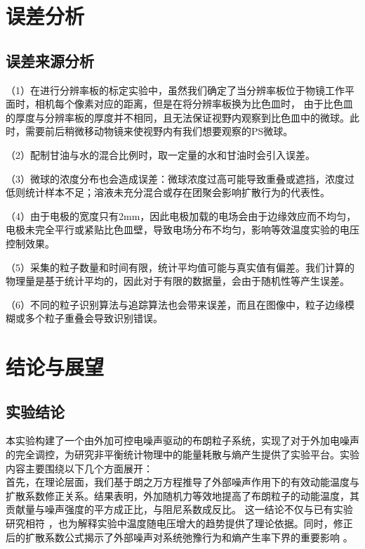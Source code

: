 \documentclass[a4paper]{report} %
\begin{document}
\chapter{误差分析}
\section{误差来源分析}
（1）在进行分辨率板的标定实验中，虽然我们确定了当分辨率板位于物镜工作平面时，相机每个像素对应的距离，但是在将分辨率板换为比色皿时，
由于比色皿的厚度与分辨率板的厚度并不相同，且无法保证视野内观察到比色皿中的微球。此时，需要前后稍微移动物镜来使视野内有我们想要观察的PS微球。 \par
（2）配制甘油与水的混合比例时，取一定量的水和甘油时会引入误差。\par
（3）微球的浓度分布也会造成误差：微球浓度过高可能导致重叠或遮挡，浓度过低则统计样本不足；溶液未充分混合或存在团聚会影响扩散行为的代表性。\par
（4）由于电极的宽度只有2mm，因此电极加载的电场会由于边缘效应而不均匀，电极未完全平行或紧贴比色皿壁，导致电场分布不均匀，影响等效温度实验的电压控制效果。\par
（5）采集的粒子数量和时间有限，统计平均值可能与真实值有偏差。我们计算的物理量是基于统计平均的，因此对于有限的数据量，会由于随机性等产生误差。\par
（6）不同的粒子识别算法与追踪算法也会带来误差，而且在图像中，粒子边缘模糊或多个粒子重叠会导致识别错误。\par

\chapter{结论与展望}
\section{实验结论}
本实验构建了一个由外加可控电噪声驱动的布朗粒子系统，实现了对于外加电噪声的完全调控，为研究非平衡统计物理中的能量耗散与熵产生提供了实验平台。实验内容主要围绕以下几个方面展开：\\

首先，在理论层面，我们基于朗之万方程推导了外部噪声作用下的有效动能温度与扩散系数修正关系。结果表明，外加随机力等效地提高了布朗粒子的动能温度，其贡献量与噪声强度的平方成正比，与阻尼系数成反比。
这一结论不仅与已有实验研究相符 \cite{Martinez2013,Roldan2014}，也为解释实验中温度随电压增大的趋势提供了理论依据。同时，修正后的扩散系数公式揭示了外部噪声对系统弛豫行为和熵产生率下界的重要影响 \cite{Leighton2024}。\par
\end{document}
